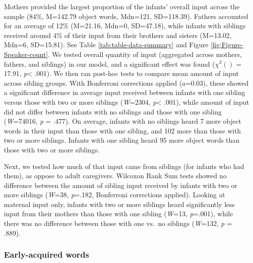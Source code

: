 \documentclass[
  english,
  man,floatsintext]{apa6}
\begin{document}
Mothers provided the largest proportion of the infants' overall input across the sample (84\%, M=142.79 object words, Mdn=121, SD=118.39). Fathers accounted for an average of 12\% (M=21.16, Mdn=0, SD=47.18), while infants with siblings received around 4\% of their input from their brothers and sisters (M=13.02, Mdn=6, SD=15.81). See Table \ref{tab:table-data-summary} and Figure \ref{fig:Figure-Speaker-count}. We tested overall quantity of input (aggregated across mothers, fathers, and siblings) in our model, and a significant effect was found (\(\chi^2 ()\) = 17.91, \emph{p}\textless{} .001). We then ran post-hoc tests to compare mean amount of input across sibling groups. With Bonferroni corrections applied (\(a\)=0.03), these showed a significant difference in average input received between infants with one sibling versus those with two or more siblings (\emph{W}=2304, \emph{p}\textless{} .001), while amount of input did not differ between infants with no siblings and those with one sibling (\emph{W}=74016, \emph{p} = .477). On average, infants with no siblings heard 7 more object words in their input than those with one sibling, and 102 more than those with two or more siblings. Infants with one sibling heard 95 more object words than those with two or more siblings.

Next, we tested how much of that input came from siblings (for infants who had them), as oppose to adult caregivers. Wilcoxon Rank Sum tests showed no difference between the amount of sibling input received by infants with two or more siblings (\emph{W}=38, \emph{p}=.182, Bonferroni corrections applied). Looking at maternal input only, infants with two or more siblings heard significantly less input from their mothers than those with one sibling (\emph{W}=13, \emph{p}=.001), while there was no difference between those with one vs.~no siblings (\emph{W}=132, \emph{p} = .889).

\hypertarget{early-acquired-words}{%
\subsubsection{Early-acquired words}\label{early-acquired-words}}
\end{document}
